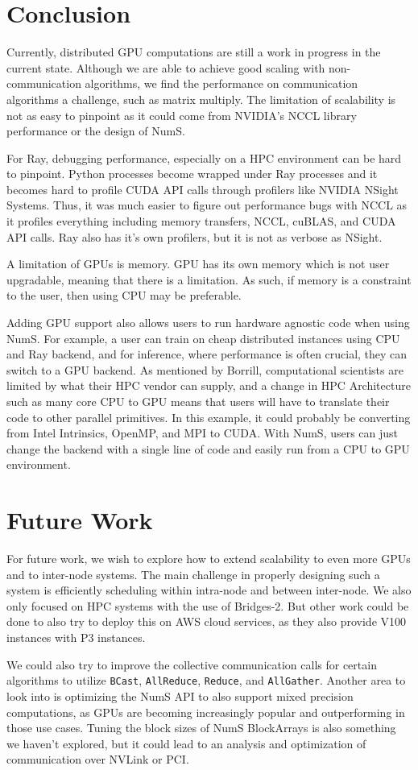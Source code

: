 \documentclass{article}
\begin{document}
\section{Conclusion}
Currently, distributed GPU computations are still a work in progress in the current state. Although we are able to achieve good scaling with non-communication algorithms, we find the performance on communication algorithms a challenge, such as matrix multiply. The limitation of scalability is not as easy to pinpoint as it could come from NVIDIA's NCCL library performance or the design of NumS.

For Ray, debugging performance, especially on a HPC environment can be hard to pinpoint. Python processes become wrapped under Ray processes and it becomes hard to profile CUDA API calls through profilers like NVIDIA NSight Systems. Thus, it was much easier to figure out performance bugs with NCCL as it profiles everything including memory transfers, NCCL, cuBLAS, and CUDA API calls. Ray also has it's own profilers, but it is not as verbose as NSight.

A limitation of GPUs is memory. GPU has its own memory which is not user upgradable, meaning that there is a limitation. As such, if memory is a constraint to the user, then using CPU may be preferable. 

Adding GPU support also allows users to run hardware agnostic code when using NumS. For example, a user can train on cheap distributed instances using CPU and Ray backend, and for inference, where performance is often crucial, they can switch to a GPU backend. As mentioned by Borrill, computational scientists are limited by what their HPC vendor can supply, and a change in HPC Architecture such as many core CPU to GPU means that users will have to translate their code to other parallel primitives. \cite{borrill} In this example, it could probably be converting from Intel Intrinsics, OpenMP, and MPI to CUDA. With NumS, users can just change the backend with a single line of code and easily run from a CPU to GPU environment.

\section{Future Work}
For future work, we wish to explore how to extend scalability to even more GPUs and to inter-node systems. The main challenge in properly designing such a system is efficiently scheduling within intra-node and between inter-node. We also only focused on HPC systems with the use of Bridges-2. But other work could be done to also try to deploy this on AWS cloud services, as they also provide V100 instances with P3 instances. 

We could also try to improve the collective communication calls for certain algorithms to utilize \verb|BCast|, \verb|AllReduce|, \verb|Reduce|, and \verb|AllGather|. Another area to look into is optimizing the NumS API to also support mixed precision computations, as GPUs are becoming increasingly popular and outperforming in those use cases. Tuning the block sizes of NumS BlockArrays is also something we haven't explored, but it could lead to an analysis and optimization of communication over NVLink or PCI.


 
\end{document}
